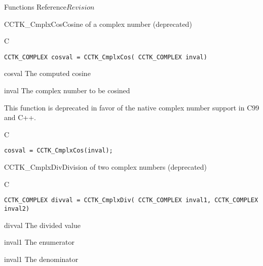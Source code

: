 \begin{cactuspart}{ Functions Reference}{}{$Revision$}
\begin{FunctionDescription}{CCTK\_CmplxCos}{Cosine of a complex number (deprecated)}
\label{CCTK-CmplxCos}
\begin{SynopsisSection}
\begin{Synopsis}{C}
\begin{verbatim}CCTK_COMPLEX cosval = CCTK_CmplxCos( CCTK_COMPLEX inval)\end{verbatim}
\end{Synopsis}
\end{SynopsisSection}
\begin{ParameterSection}
\begin{Parameter}{cosval}
The computed cosine
\end{Parameter}
\begin{Parameter}{inval}
The complex number to be cosined
\end{Parameter}
\end{ParameterSection}
\begin{Discussion}
This function is deprecated in favor of the native complex number support in
C99 and C++.
\end{Discussion}
\begin{ExampleSection}
\begin{Example}{C}
\begin{verbatim}
cosval = CCTK_CmplxCos(inval);
\end{verbatim}
\end{Example}
\end{ExampleSection}
\end{FunctionDescription}


\begin{FunctionDescription}{CCTK\_CmplxDiv}{Division of two complex numbers (deprecated)}
\label{CCTK-CmplxDiv}
\begin{SynopsisSection}
\begin{Synopsis}{C}
\begin{verbatim}CCTK_COMPLEX divval = CCTK_CmplxDiv( CCTK_COMPLEX inval1, CCTK_COMPLEX inval2)\end{verbatim}
\end{Synopsis}
\end{SynopsisSection}
\begin{ParameterSection}
\begin{Parameter}{divval}
The divided value
\end{Parameter}
\begin{Parameter}{inval1}
The enumerator
\end{Parameter}
\begin{Parameter}{inval1}
The denominator
\end{Parameter}
\end{ParameterSection}


\end{FunctionDescription}
\end{cactuspart}
